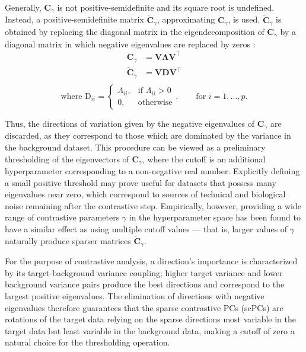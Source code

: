 Generally, $\mathbf{C}_\gamma$ is not positive-semidefinite and its square root
is undefined. Instead, a positive-semidefinite matrix
$\widetilde{\mathbf{C}}_\gamma$, approximating $\mathbf{C}_\gamma$, is used.
$\widetilde{\mathbf{C}}_\gamma$ is obtained by replacing the diagonal matrix in
the eigendecomposition of $\mathbf{C}_\gamma$ by a diagonal matrix in which
negative eigenvalues are replaced by zeros \cite{elasticnet}:
\begin{align*}
  \mathbf{C}_\gamma &= \mathbf{V}\mathbf{\Lambda}\mathbf{V}^\top \\
  \widetilde{\mathbf{C}}_\gamma &= \mathbf{V}\mathbf{D}\mathbf{V}^\top \\
\end{align*}
\begin{equation*}
\text{where } \text{D}_{ii} =
  \begin{cases}
    \Lambda_{ii}, & \text{if $\Lambda_{ii} > 0$} \\
    0, & \text{otherwise}
  \end{cases},
  \qquad 
  \text{for } i = 1, \ldots, p.
\end{equation*}

Thus, the directions of variation given by the negative eigenvalues of
$\mathbf{C}_\gamma$ are discarded, as they correspond to those which are
dominated by the variance in the background dataset. This procedure can be
viewed as a preliminary thresholding of the eigenvectors of $\mathbf{C}_\gamma$,
where the cutoff is an additional hyperparameter corresponding to a non-negative
real number. Explicitly defining a small positive threshold may prove useful for
datasets that possess many eigenvalues near zero, which correspond to sources of
technical and biological noise remaining after the contrastive step.
Empirically, however, providing a wide range of contrastive parameters $\gamma$
in the hyperparameter space has been found to have a similar effect as using
multiple cutoff values --- that is, larger values of $\gamma$ naturally produce
sparser matrices $\widetilde{\mathbf{C}}_{\gamma}$.

For the purpose of contrastive analysis, a direction's importance is
characterized by its target-background variance coupling; higher target variance
and lower background variance pairs produce the best directions \cite{Abid2018}
and correspond to the largest positive eigenvalues. The elimination of directions with negative eigenvalues
therefore guarantees that the sparse contrastive PCs (scPCs) are
rotations of the target data relying on the sparse directions most
variable in the target data but least variable in the background data, making
a cutoff of zero a natural choice for the thresholding operation.

